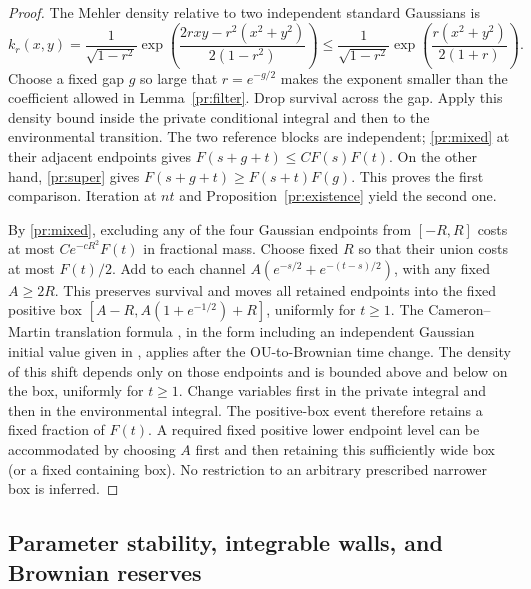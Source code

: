 \begin{proof}
The Mehler density relative to two independent standard Gaussians is
\[
 k_r(x,y)=\frac1{\sqrt{1-r^2}}
 \exp\left(\frac{2rxy-r^2(x^2+y^2)}{2(1-r^2)}\right)
 \le\frac1{\sqrt{1-r^2}}
       \exp\left(\frac{r(x^2+y^2)}{2(1+r)}\right).
\]
Choose a fixed gap $g$ so large that $r=e^{-g/2}$ makes the exponent
smaller than the coefficient allowed in Lemma~\ref{pr:filter}.
Drop survival across the gap. Apply this density bound inside the private
conditional integral and then to the environmental transition. The two
reference blocks are independent; \eqref{pr:mixed} at their adjacent
endpoints gives $F(s+g+t)\le C F(s)F(t)$. On the other hand,
\eqref{pr:super} gives $F(s+g+t)\ge F(s+t)F(g)$. This proves the first
comparison. Iteration at $nt$ and Proposition~\ref{pr:existence} yield
the second one.

By \eqref{pr:mixed}, excluding any of the four Gaussian endpoints from
$[-R,R]$ costs at most $Ce^{-cR^2}F(t)$ in fractional mass. Choose fixed
$R$ so that their union costs at most $F(t)/2$. Add to each channel
$A(e^{-s/2}+e^{-(t-s)/2})$, with any fixed $A\ge2R$. This preserves
survival and moves all retained endpoints into the fixed positive box
$[A-R,A(1+e^{-1/2})+R]$, uniformly for $t\ge1$.
The Cameron--Martin translation formula \cite{CameronMartin1944}, in
the form including an independent Gaussian initial value given in
\cite[Theorem~2.1]{BarbourRossZheng2024}, applies after the OU-to-Brownian
time change. The density of this shift depends only on those endpoints and is bounded above and below
on the box, uniformly for $t\ge1$. Change variables first in the private
integral and then in the environmental integral. The positive-box event
therefore retains a fixed fraction of $F(t)$. A required fixed positive
lower endpoint level can be accommodated by choosing $A$ first and then
retaining this sufficiently wide box (or a fixed containing box).
No restriction to an arbitrary prescribed narrower box is inferred.
\end{proof}

\subsection{Parameter stability, integrable walls, and Brownian reserves}

